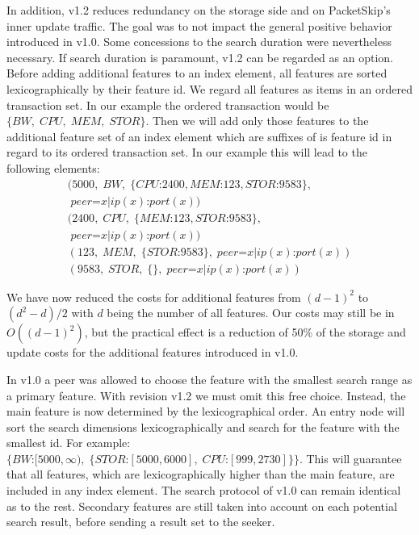 In addition, v1.2 reduces redundancy on the storage side and on PacketSkip's inner update traffic. The goal was to not impact the general positive behavior introduced in v1.0. Some concessions to the search duration were nevertheless necessary. If search duration is paramount, v1.2 can be regarded as an option. Before adding additional features to an index element, all features are sorted lexicographically by their feature id. We regard all features as items in an ordered transaction set. In our example the ordered transaction would be $\{ BW,\;CPU,\;MEM,\;STOR \}$. Then we will add only those features to the additional feature set of an index element which are suffixes of is feature id in regard to its ordered transaction set. In our example this will lead to the following elements:
\begin{equation*}
\begin{split}
(5000, \;BW,   \;\{ CPU\text{:}2400, MEM\text{:}123, STOR\text{:}9583 \}, \\ \;peer\text{=}x | ip(x)\text{:}port(x)) \\
(2400, \;CPU,  \;\{ MEM\text{:}123, STOR\text{:}9583 \},                  \\ \;peer\text{=}x | ip(x)\text{:}port(x)) \\
(123,  \;MEM,  \;\{ STOR\text{:}9583 \},                                     \;peer\text{=}x | ip(x)\text{:}port(x)) \\
(9583, \;STOR, \;\{ \},                                                      \;peer\text{=}x | ip(x)\text{:}port(x))
\end{split}
\end{equation*}

We have now reduced the costs for additional features from $(d-1)^2$ to $(d^2-d)/2$ with $d$ being the number of all features. Our costs may still be in $O((d-1)^2)$, but the practical effect is a reduction of 50\% of the storage and update costs for the additional features introduced in v1.0.

In v1.0 a peer was allowed to choose the feature with the smallest search range as a primary feature. With revision v1.2 we must omit this free choice. Instead, the main feature is now determined by the lexicographical order. An entry node will sort the search dimensions lexicographically and search for the feature with the smallest id. For example: $\{ BW\text{:}[5000,\infty), \;\{ STOR\text{:}[5000,6000], \;CPU\text{:}[999,2730] \} \}$. This will guarantee that all features, which are lexicographically higher than the main feature, are included in any index element. The search protocol of v1.0 can remain identical as to the rest. Secondary features are still taken into account on each potential search result, before sending a result set to the seeker.

